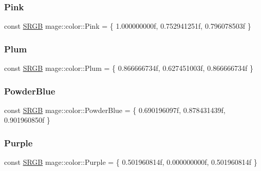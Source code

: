 \hypertarget{namespacemage_1_1color_abd654ce3abccac9e26f4a34977209ef2}{}\label{namespacemage_1_1color_abd654ce3abccac9e26f4a34977209ef2} 
\subsubsection{\texorpdfstring{Pink}{Pink}}
{\footnotesize\ttfamily const \hyperlink{structmage_1_1_s_r_g_b}{S\+R\+GB} mage\+::color\+::\+Pink = \{ 1.\+000000000f, 0.\+752941251f, 0.\+796078503f \}}

\hypertarget{namespacemage_1_1color_ad41f13fc2474a111381b6f8b79e99ec2}{}\label{namespacemage_1_1color_ad41f13fc2474a111381b6f8b79e99ec2} 
\subsubsection{\texorpdfstring{Plum}{Plum}}
{\footnotesize\ttfamily const \hyperlink{structmage_1_1_s_r_g_b}{S\+R\+GB} mage\+::color\+::\+Plum = \{ 0.\+866666734f, 0.\+627451003f, 0.\+866666734f \}}

\hypertarget{namespacemage_1_1color_a2f974671d6f2a139efbf1414b49d21df}{}\label{namespacemage_1_1color_a2f974671d6f2a139efbf1414b49d21df} 
\subsubsection{\texorpdfstring{Powder\+Blue}{PowderBlue}}
{\footnotesize\ttfamily const \hyperlink{structmage_1_1_s_r_g_b}{S\+R\+GB} mage\+::color\+::\+Powder\+Blue = \{ 0.\+690196097f, 0.\+878431439f, 0.\+901960850f \}}

\hypertarget{namespacemage_1_1color_a1a4dffb3c00c7eb71cfa8e33b1586e0f}{}\label{namespacemage_1_1color_a1a4dffb3c00c7eb71cfa8e33b1586e0f} 
\subsubsection{\texorpdfstring{Purple}{Purple}}
{\footnotesize\ttfamily const \hyperlink{structmage_1_1_s_r_g_b}{S\+R\+GB} mage\+::color\+::\+Purple = \{ 0.\+501960814f, 0.\+000000000f, 0.\+501960814f \}}

